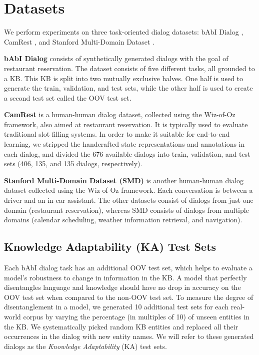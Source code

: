 \section{Datasets}

We perform experiments on three task-oriented dialog datasets: bAbI Dialog \cite{BordesW16}, CamRest \cite{wenEMNLP2016}, and Stanford Multi-Domain Dataset \cite{Ericsigdial}.

\noindent 
\textbf{bAbI Dialog} consists of synthetically generated dialogs with the goal of restaurant reservation. The dataset consists of five different tasks, all grounded to a KB. This KB is split into two mutually exclusive halves. One half is used to generate the train, validation, and test sets, while the other half is used to create a second test set called the OOV test set. 

\noindent 
\textbf{CamRest} is a human-human dialog dataset, collected using the Wiz-of-Oz framework, also aimed at restaurant reservation. It is typically used to evaluate traditional slot filling systems. In order to make it suitable for end-to-end learning, we stripped the handcrafted state representations and annotations in each dialog, and divided the 676 available dialogs into train, validation, and test sets (406, 135, and 135 dialogs, respectively).

\noindent
\textbf{Stanford Multi-Domain Dataset (SMD)} is another human-human dialog dataset collected using the Wiz-of-Oz framework. Each conversation is between a driver and an in-car assistant. The other datasets consist of dialogs from just one domain (restaurant reservation), whereas SMD consists of dialogs from multiple domains (calendar scheduling, weather information retrieval, and navigation).

\subsection{Knowledge Adaptability (KA) Test Sets}

Each bAbI dialog task has an additional OOV test set, which helps to evaluate a model's robustness to change in information in the KB. A model that perfectly disentangles language and knowledge should have no drop in accuracy on the OOV test set when compared to the non-OOV test set. To measure the degree of disentanglement in a model, we generated 10 additional test sets for each real-world corpus by varying the percentage (in multiples of 10) of unseen entities in the KB. We systematically picked random KB entities and replaced all their occurrences in the dialog with new entity names. We will refer to these generated dialogs as the \emph{Knowledge Adaptability} (KA) test sets.

